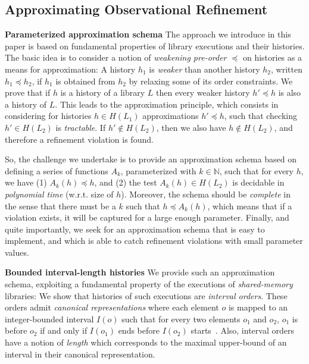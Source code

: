 \subsection{Approximating Observational Refinement}
\label{sec:intro:approx}

{\bf Parameterized approximation schema}
The approach we introduce in this paper is based on fundamental properties of
library executions and their histories. The basic idea is to consider a notion
of \emph{weakening pre-order} $\preceq$ on histories as a means for
approximation: A history $h_1$ is \emph{weaker} than another history $h_2$,
written $h_1 \preceq h_2$, if $h_1$ is obtained from $h_2$ by relaxing some of
its order constraints. We prove that if $h$ is a history of a library $L$ then 
every weaker history $h'\preceq h$ is also a history of $L$. This leads to the approximation principle, 
which consists in considering for histories $h\in H(L_1)$ approximations $h' \preceq h$, such that checking 
$h' \in H(L_2)$ is \emph{tractable}. If $h' \not\in H(L_2)$, then we also have $h \not\in
H(L_2)$, and therefore a refinement violation is found.

So, the challenge we undertake is to provide an approximation schema based on
defining a series of functions $A_k$, parameterized with $k \in \mathbb{N}$,
such that for every $h$, we have (1) $A_k (h) \preceq h$, and (2) the test
$A_k(h) \in H(L_2)$ is decidable in \emph{polynomial time} (w.r.t. size of $h$).
Moreover, the schema should be \emph{complete} in the sense that there must be a
$k$ such that $h \preceq A_k(h)$, which means that if a violation exists, it
will be captured for a large enough parameter. Finally, and quite importantly,
we seek for an approximation schema that is easy to implement, and which is
able to catch refinement violations with small parameter values.

\vspace{1mm}
{\bf Bounded interval-length histories}
We provide such an approximation schema, exploiting a fundamental
property of the executions of \emph{shared-memory} libraries: We show
that histories of such executions are \emph{interval orders}. These orders
admit \emph{canonical representations} where each element $o$ is
mapped to an integer-bounded interval $I(o)$ such that for every two elements
$o_1$ and $o_2$, $o_1$ is before $o_2$ if and only if $I(o_1)$ ends before
$I(o_2)$ starts~\cite{phd/Greenough76}. Also, interval orders have a 
notion of \emph{length} which corresponds to the maximal upper-bound of an
interval in their canonical representation.

